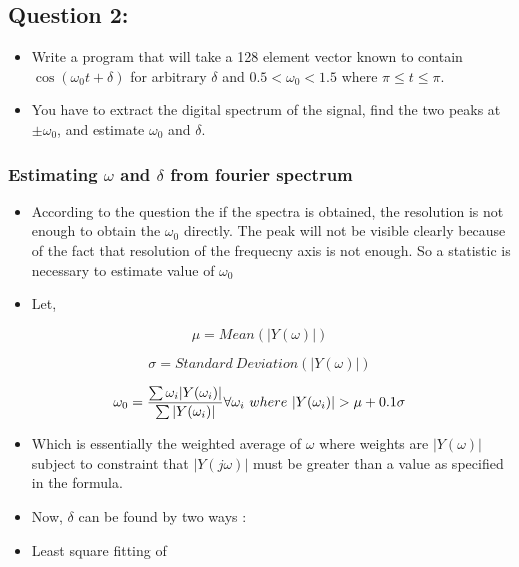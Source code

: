 \documentclass[11pt, a4paper]{article}
\begin{document}
  \subsection{Question 2:}\label{question-3}

  \begin{itemize}
  
  \item
    Write a program that will take a 128 element vector known to contain
    \(\cos(\omega_0 t + \delta)\) for arbitrary \(\delta\) and
    \(0.5 < \omega_0 < 1.5\) where \(\pi \leq t \leq \pi\).
  \item
    You have to extract the digital spectrum of the signal, find the two
    peaks at \(\pm \omega_0\), and estimate \(\omega_0\) and \(\delta\).
  \end{itemize}
  
   \subsubsection{Estimating \(\omega\) and \(\delta\) from fourier spectrum}
  
  \begin{itemize}
  \item
    According to the question the if the spectra is obtained, the
    resolution is not enough to obtain the \(\omega_0\) directly. The peak
    will not be visible clearly because of the fact that resolution of the
    frequecny axis is not enough. So a statistic is necessary to estimate
    value of \(\omega_0\)
  \item
    Let,
  \end{itemize}
  
  \begin{equation}
  \mu = Mean(|Y(\omega)|)
  \end{equation}
  
  \begin{equation}
  \sigma = Standard\ Deviation(|Y(\omega)|)
  \end{equation}
  
  \begin{equation}
  \omega_0 = \frac{\sum \omega_i |Y(\omega_i)|}{\sum |Y(\omega_i)|} \\
  \\
  \forall \omega_i\ where\ |Y(\omega_i)| > \mu + 0.1\sigma
  \end{equation}
  
  \begin{itemize}
  \item
    Which is essentially the weighted average of \(\omega\) where weights
    are \(|Y(\omega)|\) subject to constraint that \(|Y(j\omega)|\) must
    be greater than a value as specified in the formula.
  \item
    Now, \(\delta\) can be found by two ways :
  \item
    Least square fitting of
  \end{itemize}
  
\end{document}
